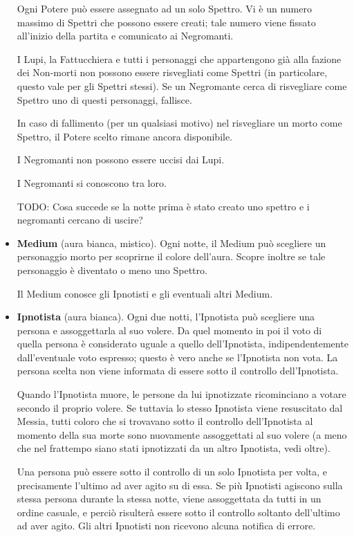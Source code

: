 \documentclass[a4paper,10pt]{article}
\begin{document}
\begin{itemize}
 Ogni Potere può essere assegnato ad un solo Spettro. Vi è un numero massimo di Spettri che possono essere creati; tale numero viene fissato all'inizio della partita e comunicato ai Negromanti.

 I Lupi, la Fattucchiera e tutti i personaggi che appartengono già alla fazione dei Non-morti non possono essere risvegliati come Spettri (in particolare, questo vale per gli Spettri stessi). Se un Negromante cerca di risvegliare come Spettro uno di questi personaggi, fallisce.
 
 In caso di fallimento (per un qualsiasi motivo) nel risvegliare un morto come Spettro, il Potere scelto rimane ancora disponibile.
 
 I Negromanti non possono essere uccisi dai Lupi.

 I Negromanti si conoscono tra loro.
 
 TODO: Cosa succede se la notte prima è stato creato uno spettro e i negromanti cercano di uscire?

 \item {\bf Medium} (aura bianca, mistico). Ogni notte, il Medium può scegliere un personaggio morto per scoprirne il colore dell'aura. Scopre inoltre se tale personaggio è diventato o meno uno Spettro.

 Il Medium conosce gli Ipnotisti e gli eventuali altri Medium.

 \item {\bf Ipnotista} (aura bianca). Ogni due notti, l'Ipnotista può scegliere una persona e assoggettarla al suo volere. Da quel momento in poi il voto di quella persona è considerato uguale a quello dell'Ipnotista, indipendentemente dall'eventuale voto espresso; questo è vero anche se l'Ipnotista non vota.
 La persona scelta non viene informata di essere sotto il controllo dell'Ipnotista.

 Quando l'Ipnotista muore, le persone da lui ipnotizzate ricominciano a votare secondo il proprio volere. Se tuttavia lo stesso Ipnotista viene resuscitato dal Messia, tutti coloro che si trovavano sotto il controllo dell'Ipnotista al momento della sua morte sono nuovamente assoggettati al suo volere (a meno che nel frattempo siano stati ipnotizzati da un altro Ipnotista, vedi oltre).

 Una persona può essere sotto il controllo di un solo Ipnotista per volta, e precisamente l'ultimo ad aver agito su di essa. Se più Ipnotisti agiscono sulla stessa persona durante la stessa notte, viene assoggettata da tutti in un ordine casuale, e perciò risulterà essere sotto il controllo soltanto dell'ultimo ad aver agito. Gli altri Ipnotisti non ricevono alcuna notifica di errore. 


\end{itemize}
\end{document}
